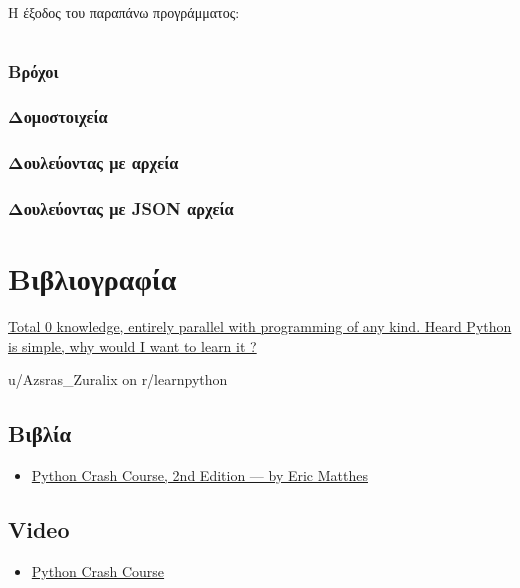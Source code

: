 \documentclass[12pt]{extreport}
\begin{document}


Η έξοδος του παραπάνω προγράμματος:

\begin{lstlisting}[language={}]
\end{lstlisting}


\newpage
\subsection{Βρόχοι}

\newpage\subsection{Δομοστοιχεία}
\newpage\subsection{Δουλεύοντας με αρχεία}
\newpage\subsection{Δουλεύοντας με JSON αρχεία}

\chapter{Βιβλιογραφία}
\epigraph{\href{https://tinyurl.com/ycnad9ch}
    {Total 0 knowledge, entirely parallel with programming of any kind.
        Heard Python is simple, why would I want to learn it ?
    }
}{u/Azsras\_Zuralix on r/learnpython}
\newpage
\section{Βιβλία}
\begin{itemize}
    \item \href{https://tinyurl.com/y7l2a48c}{Python Crash Course, 2nd
              Edition — by Eric Matthes}
\end{itemize}
\section{Video}
\begin{itemize}
    \item \href{https://tinyurl.com/ya8wk4xm}{Python Crash Course}
\end{itemize}
\end{document}
